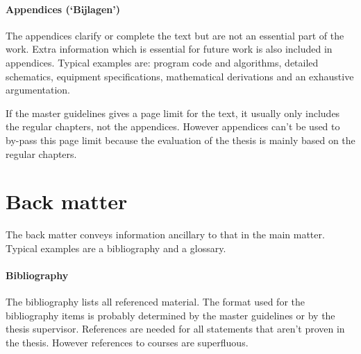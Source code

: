 \documentclass[11pt,article,oneside,a4paper]{memoir}
\newcommand\Dutch[1]{`\foreignlanguage{dutch}{#1}'}
\begin{document}
\paragraph{Appendices (\Dutch{Bijlagen})} The appendices clarify or
complete the text but are not an essential part of the work. Extra
information which is essential for future work is also included in
appendices. Typical examples are: program code and algorithms, detailed
schematics, equipment specifications, mathematical derivations and an
exhaustive argumentation.

If the master guidelines gives a page limit for the text, it usually only
includes the regular chapters, not the appendices. However appendices can't
be used to by-pass this page limit because the evaluation of the thesis is
mainly based on the regular chapters.

\section{Back matter}
The back matter conveys information ancillary to that in the main matter.
Typical examples are a bibliography and a glossary.

\paragraph{Bibliography} The bibliography lists all referenced material.
The format used for the bibliography items is probably determined by the
master guidelines or by the thesis supervisor. References are needed for all
statements that aren't proven in the thesis. However references to courses
are superfluous.
\end{document}
